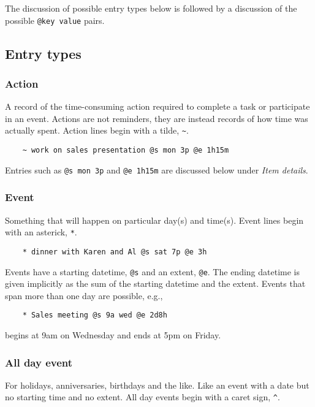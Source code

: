 \documentclass[]{article}
\begin{document}
The discussion of possible entry types below is followed by a discussion
of the possible \texttt{@key value} pairs.

\subsection{Entry types}

\subsubsection{Action}

A record of the time-consuming action required to complete a task or
participate in an event. Actions are not reminders, they are instead
records of how time was actually spent. Action lines begin with a tilde,
\texttt{\textasciitilde{}}.

\begin{verbatim}
    ~ work on sales presentation @s mon 3p @e 1h15m
\end{verbatim}

Entries such as \texttt{@s mon 3p} and \texttt{@e 1h15m} are discussed
below under \emph{Item details}.

\subsubsection{Event}

Something that will happen on particular day(s) and time(s). Event lines
begin with an asterick, \texttt{*}.

\begin{verbatim}
    * dinner with Karen and Al @s sat 7p @e 3h
\end{verbatim}

Events have a starting datetime, \texttt{@s} and an extent, \texttt{@e}.
The ending datetime is given implicitly as the sum of the starting
datetime and the extent. Events that span more than one day are
possible, e.g.,

\begin{verbatim}
    * Sales meeting @s 9a wed @e 2d8h
\end{verbatim}

begins at 9am on Wednesday and ends at 5pm on Friday.

\subsubsection{All day event}

For holidays, anniversaries, birthdays and the like. Like an event with
a date but no starting time and no extent. All day events begin with a
caret sign, \texttt{\^{}}.
\end{document}
